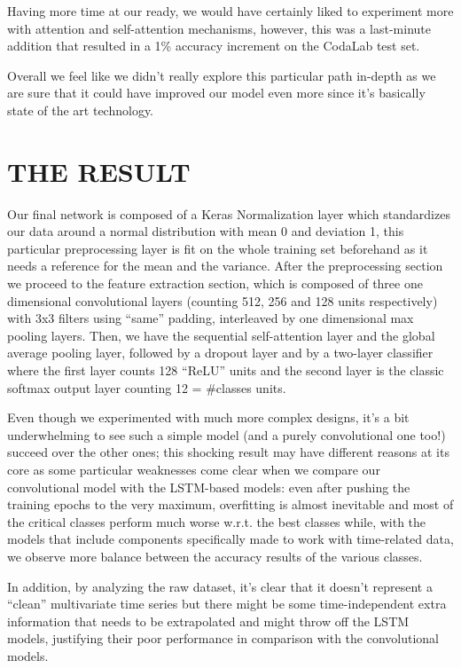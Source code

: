 \documentclass[11pt]{report}
\begin{document}
Having more time at our ready, we would have certainly liked to experiment more with attention and self-attention mechanisms, however, this was a last-minute addition that resulted in a 1\% accuracy increment on the CodaLab test set.

Overall we feel like we didn’t really explore this particular path in-depth as we are sure that it could have improved our model even more since it’s basically state of the art technology.

\section{THE RESULT}
Our final network is composed of a Keras Normalization layer which standardizes our data around a normal distribution with mean 0 and deviation 1, this particular preprocessing layer is fit on the whole training set beforehand as it needs a reference for the mean and the variance.
After the preprocessing section we proceed to the feature extraction section, which is composed of three one dimensional convolutional layers (counting 512, 256 and 128 units respectively) with 3x3 filters using “same” padding, interleaved by one dimensional max pooling layers.
Then, we have the sequential self-attention layer and the global average pooling layer, followed by a dropout layer and by a two-layer classifier where the first layer counts 128 “ReLU” units and the second layer is the classic softmax output layer counting 12 = \#classes units.

Even though we experimented with much more complex designs, it’s a bit underwhelming to see such a simple model (and a purely convolutional one too!) succeed over the other ones; this shocking result may have different reasons at its core as some particular weaknesses come clear when we compare our convolutional model with the LSTM-based models: even after pushing the training epochs to the very maximum, overfitting is almost inevitable and most of the critical classes perform much worse w.r.t. the best classes while, with the models that include components specifically made to work with time-related data, we observe more balance between the accuracy results of the various classes.

In addition, by analyzing the raw dataset, it’s clear that it doesn’t represent a “clean” multivariate time series but there might be some time-independent extra information that needs to be extrapolated and might throw off the LSTM models, justifying their poor performance in comparison with the convolutional models.
\end{document}
